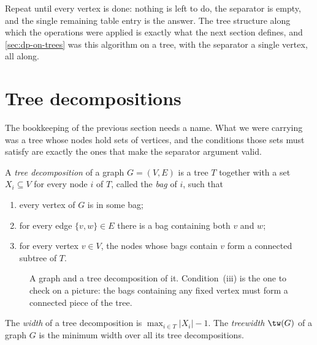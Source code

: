 Repeat until every vertex is done: nothing is left to do, the separator is
empty, and the single remaining table entry is the answer. The tree structure
along which the operations were applied is exactly what the next section
defines, and \cref{sec:dp-on-trees} was this algorithm on a tree, with the
separator a single vertex, all along.

\section{Tree decompositions}
\label{sec:tree-decompositions}

The bookkeeping of the previous section needs a name. What we were carrying was
a tree whose nodes hold sets of vertices, and the conditions those sets must
satisfy are exactly the ones that make the separator argument valid.

\begin{definition}\label{def:tree-decomposition}
A \emph{tree decomposition} of a graph $G = (V,E)$ is a tree $T$ together with a
set $X_i \subseteq V$ for every node $i$ of $T$, called the \emph{bag} of $i$,
such that
\begin{enumerate}[label=(\roman*),leftmargin=*]
  \item every vertex of $G$ is in some bag;
  \item for every edge $\{v,w\} \in E$ there is a bag containing both $v$ and
        $w$;
  \item for every vertex $v \in V$, the nodes whose bags contain $v$ form a
        connected subtree of $T$.
\end{enumerate}
\end{definition}

\begin{figure}[ht]
\centering
{}
\caption{A graph and a tree decomposition of it. Condition~(iii) is the one to
check on a picture: the bags containing any fixed vertex must form a connected
piece of the tree.}
\label{fig:tw-decomposition}
\end{figure}

\begin{definition}\label{def:treewidth}
The \emph{width} of a tree decomposition is $\max_{i \in T} |X_i| - 1$. The
\emph{treewidth} $\tw(G)$ of a graph $G$ is the minimum width over all its tree
decompositions.
\end{definition}

